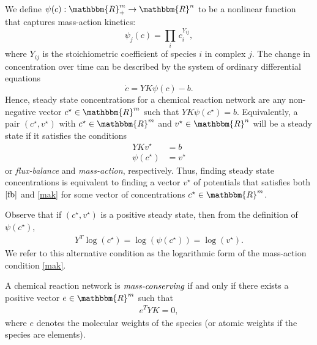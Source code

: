 \documentclass[smallextended]{svjour3}       %
\newcommand*{\0}{\mathbf{0}}
\newcommand*{\1}{\mathbf{1}}
\newcommand*{\R}{\mathbbm{R}}
\begin{document}
We define $\psi(c):\R^m_+\rightarrow \R^n$ to be a nonlinear function that
captures mass-action kinetics:
\[
\psi_j(c) = \prod_i\,c_i^{Y_{ij}},
\]
where $Y_{ij}$ is the stoichiometric coefficient of species $i$ in complex $j$.
The change in concentration over time can be described by the system of
ordinary differential equations 
\[
\dot{c} = YK\psi(c) - b.
\] 
\noindent Hence, steady state concentrations for a chemical reaction network
are any non-negative vector $c^\star\in\R^m$ such that $YK\psi(c^\star)=b$.
Equivalently, a pair $(c^\star,v^\star)$ with $c^\star\in\R^m$ and
$v^\star\in\R^n$ will be a steady state if it satisfies the conditions
\begin{align} 
  YKv^\star &=b \label{fb}\tag{FB} \\ \psi(c^\star) &= v^\star
  \label{mak}\tag{MA} 
\end{align}
or \emph{flux-balance} and \emph{mass-action}, respectively. Thus, finding 
steady state concentrations is equivalent to finding a vector $v^\star$ of potentials
that satisfies both $\eqref{fb}$ and \eqref{mak} for some vector of concentrations 
$c^\star\in\R^m$.

Observe that if $(c^\star,v^\star)$ is a positive steady state, then from the
definition of $\psi(c^\star)$,
\begin{align}
  Y^T\log(c^\star)= \log(\psi(c^\star))= \log(v^\star).
  \label{mak-alt}
	\tag{MA-log}
\end{align} 
We refer to this alternative condition as the logarithmic form of the
mass-action condition \eqref{mak}. 

\begin{defn}
	A chemical reaction network is $\emph{mass-conserving}$ if and only if there
	exists a positive vector $e\in\R^m$ such that 
	\begin{align}
	 e^TYK=0,
	  \label{consis}
	\end{align}
	where $e$ denotes the molecular weights of the species (or atomic weights if
	the species are elements).  
\end{defn}

\end{document}
